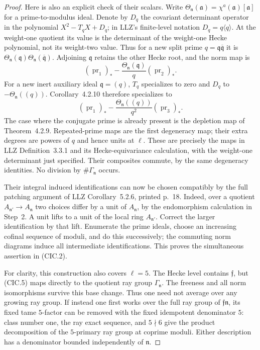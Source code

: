 \begin{proof}
Here is also an explicit check of their scalars.  Write
$\Theta_{\mathfrak n}(\mathfrak a)
=\chi^a(\mathfrak a)[\mathfrak a]$ for a prime-to-modulus
ideal.  Denote by $D_q$ the covariant determinant operator
in the polynomial $X^2-T_qX+D_q$; in LLZ's finite-level
notation $D_q=q\langle q\rangle$.
At the weight-one quotient its value is the determinant
of the weight-one Hecke polynomial, not its weight-two
value.  Thus for a new split prime
$q=\mathfrak q\overline{\mathfrak q}$ it is
$\Theta_{\mathfrak n}(\mathfrak q)
 \Theta_{\mathfrak n}(\overline{\mathfrak q})$.
Adjoining $\mathfrak q$ retains the other Hecke root,
and the norm map is
\[
       (\operatorname{pr}_1)_*
       -\frac{\Theta_{\mathfrak n}(\mathfrak q)}q
                      (\operatorname{pr}_2)_* .         \tag{CIC.7}
\]
For a new inert auxiliary ideal $\mathfrak q=(q)$,
$T_q$ specializes to zero and $D_q$ to
$-\Theta_{\mathfrak n}((q))$.  Corollary~4.2.10 therefore
specializes to
\[
       (\operatorname{pr}_1)_*
       -\frac{\Theta_{\mathfrak n}((q))}{q^2}
                      (\operatorname{pr}_3)_* .         \tag{CIC.8}
\]
The case where the conjugate prime is already present is
the depletion map of Theorem~4.2.9.  Repeated-prime maps
are the first degeneracy map; their extra degrees are
powers of $q$ and hence units at $\ell$.
These are precisely the maps in LLZ Definition~3.3.1 and
its Hecke-equivariance calculation, with the weight-one
determinant just specified.  Their composites commute,
by the same degeneracy identities.  No division by
$\#\Gamma_{\mathfrak n}$ occurs.

Their integral induced identifications can now be chosen
compatibly by the full patching argument of LLZ
Corollary~5.2.6, printed p.~18.  Indeed, over a quotient
$A_{\mathfrak n'}\to A_{\mathfrak n}$ two choices differ
by a unit of $A_{\mathfrak n}$, by the endomorphism
calculation in Step~2.  A unit lifts to a unit of the
local ring $A_{\mathfrak n'}$.  Correct the larger
identification by that lift.  Enumerate the prime ideals,
choose an increasing cofinal sequence of moduli, and do
this successively; the commuting norm diagrams induce
all intermediate identifications.  This proves the
simultaneous assertion in (CIC.2).

For clarity, this construction also covers $\ell=5$.
The Hecke level contains $\mathfrak f$, but (CIC.5) maps
directly to the quotient ray group $\Gamma_{\mathfrak n}$.
The freeness and all norm isomorphisms survive this base
change.  Thus one need not average over any growing ray
group.  If instead one first works over the full ray
group of $\mathfrak f\mathfrak n$, its fixed tame
$5$-factor can be removed with the fixed idempotent
denominator $5$: class number one, the ray exact
sequence, and $5\nmid6$ give the product decomposition
of the $5$-primary ray group at coprime moduli.  Either
description has a denominator bounded independently of
$\mathfrak n$.


\end{proof}
